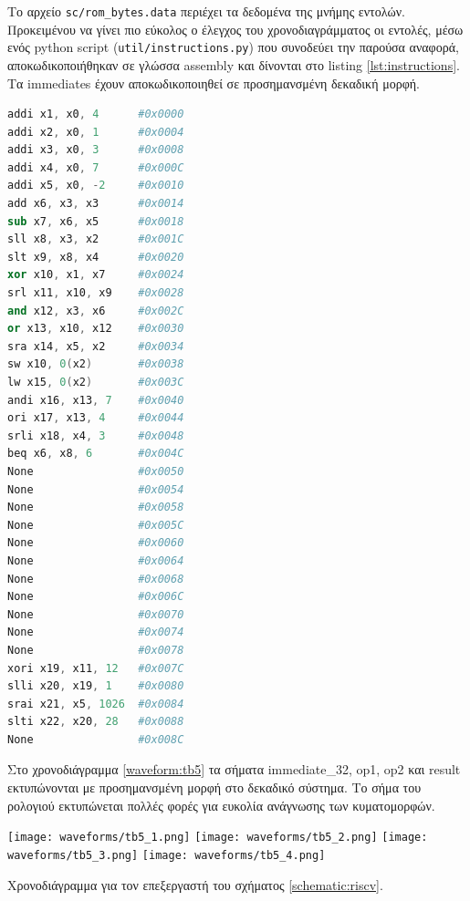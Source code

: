 Το αρχείο \texttt{sc/rom\_bytes.data} περιέχει τα δεδομένα της μνήμης εντολών. Προκειμένου να γίνει πιο εύκολος ο έλεγχος του χρονοδιαγράμματος οι εντολές, μέσω ενός python script (\texttt{util/instructions.py}) που συνοδεύει την παρούσα αναφορά, αποκωδικοποιήθηκαν σε γλώσσα assembly και δίνονται στο listing \ref{lst:instructions}. Τα immediates έχουν αποκωδικοποιηθεί σε προσημανσμένη δεκαδική μορφή.\par


\begin{lstlisting}[language=Assembler,tabsize=4,basicstyle=\ttfamily,caption={Περιεχόμενα μνήμης εντολών σε μορφή γλώσσας assembly. Τα πεδία των καταχωρητών εμφανίζονται με τη σειρά του σχήματος \ref{schematic:instructions}},label={lst:instructions}]
addi x1, x0, 4		#0x0000
addi x2, x0, 1		#0x0004
addi x3, x0, 3		#0x0008
addi x4, x0, 7		#0x000C
addi x5, x0, -2		#0x0010
add x6, x3, x3		#0x0014
sub x7, x6, x5		#0x0018
sll x8, x3, x2		#0x001C
slt x9, x8, x4		#0x0020
xor x10, x1, x7		#0x0024
srl x11, x10, x9	#0x0028
and x12, x3, x6		#0x002C
or x13, x10, x12	#0x0030
sra x14, x5, x2		#0x0034
sw x10, 0(x2)		#0x0038
lw x15, 0(x2)		#0x003C
andi x16, x13, 7	#0x0040
ori x17, x13, 4		#0x0044
srli x18, x4, 3		#0x0048
beq x6, x8, 6		#0x004C
None				#0x0050
None				#0x0054
None				#0x0058
None				#0x005C
None				#0x0060
None				#0x0064
None				#0x0068
None				#0x006C
None				#0x0070
None				#0x0074
None				#0x0078
xori x19, x11, 12	#0x007C
slli x20, x19, 1	#0x0080
srai x21, x5, 1026	#0x0084
slti x22, x20, 28	#0x0088
None				#0x008C
\end{lstlisting}

Στο χρονοδιάγραμμα \ref{waveform:tb5} τα σήματα immediate\_32, op1, op2 και result εκτυπώνονται με προσημανσμένη μορφή στο δεκαδικό σύστημα. Το σήμα του ρολογιού εκτυπώνεται πολλές φορές για ευκολία ανάγνωσης των κυματομορφών.\par

\begin{plotenv}[H]
	\centering
	\texttt{[image: waveforms/tb5\_1.png]}
	\centering
	\texttt{[image: waveforms/tb5\_2.png]}
	\centering
	\texttt{[image: waveforms/tb5\_3.png]}
	\centering
	\texttt{[image: waveforms/tb5\_4.png]}
	\caption{Χρονοδιάγραμμα για τον επεξεργαστή του σχήματος \ref{schematic:riscv}.}
	\label{waveform:tb5}
\end{plotenv}

